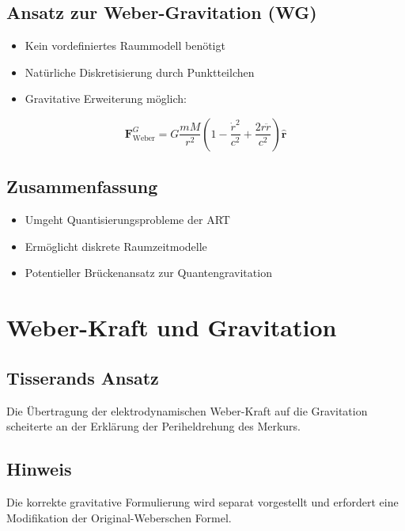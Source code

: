 \subsection{Ansatz zur Weber-Gravitation (WG)}
\begin{itemize}[leftmargin=*,noitemsep]
    \item Kein vordefiniertes Raummodell benötigt
    \item Natürliche Diskretisierung durch Punktteilchen
    \item Gravitative Erweiterung möglich:
\end{itemize}

\begin{equation}
\bm{F}_{\text{Weber}}^{G} = G\frac{mM}{r^2}\left(1 - \frac{\dot{r}^2}{c^2} + \frac{2r\ddot{r}}{c^2}\right)\bm{\hat{r}}
\end{equation}

\subsection*{Zusammenfassung}
\begin{itemize}[leftmargin=*,noitemsep]
    \item Umgeht Quantisierungsprobleme der ART
    \item Ermöglicht diskrete Raumzeitmodelle
    \item Potentieller Brückenansatz zur Quantengravitation
\end{itemize}

\section{Weber-Kraft und Gravitation}
\subsection*{Tisserands Ansatz}
Die Übertragung der elektrodynamischen Weber-Kraft \cite{tisserand1894} auf die Gravitation scheiterte an der Erklärung der Periheldrehung des Merkurs.

\subsection*{Hinweis}
Die korrekte gravitative Formulierung wird separat vorgestellt und erfordert eine Modifikation der Original-Weberschen Formel.
